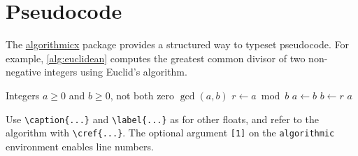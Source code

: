 \section{Pseudocode}
\label{sec:pseudocode}

The \href{https://ctan.org/pkg/algorithmicx}{algorithmicx} package provides a
structured way to typeset pseudocode. For example, \cref{alg:euclidean}
computes the greatest common divisor of two non-negative integers using
Euclid's algorithm.

\begin{algorithm}[htb]
	\caption{Euclidean algorithm}
	\label{alg:euclidean}
	\begin{algorithmic}[1]
		\Require Integers $a \geq 0$ and $b \geq 0$, not both zero
		\Ensure $\gcd(a,b)$
			\State $r \gets a \bmod b$
			\State $a \gets b$
			\State $b \gets r$
		\EndWhile
		\State \Return $a$
	\end{algorithmic}
\end{algorithm}

Use \verb|\caption{...}| and \verb|\label{...}| as for other floats, and
refer to the algorithm with \verb|\cref{...}|. The optional argument
\verb|[1]| on the \texttt{algorithmic} environment enables line numbers.

